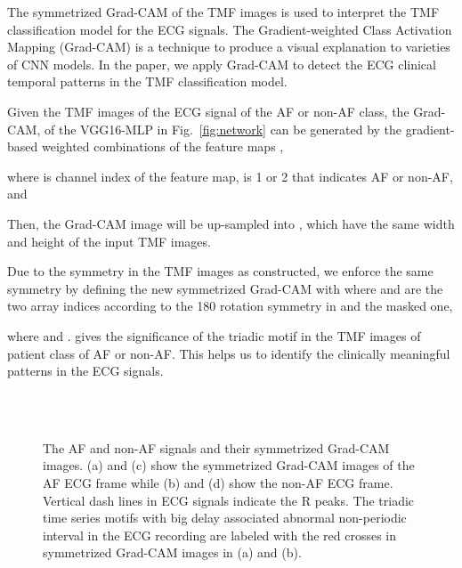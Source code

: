 \documentclass[journal]{IEEEtran}
\begin{document}
The symmetrized Grad-CAM of the TMF images is used to interpret the TMF classification model for the ECG signals. The Gradient-weighted Class Activation Mapping (Grad-CAM) \cite{Grad_CAM_2017} is a technique to produce a visual explanation to varieties of CNN models. In the paper, we apply Grad-CAM to detect the ECG clinical temporal patterns in the TMF classification model. 

Given the TMF images of the ECG signal of the AF or non-AF class, the Grad-CAM,  of the VGG16-MLP in Fig.~\ref{fig:network} can be generated by the gradient-based weighted combinations of the feature maps ,

where  is channel index of the feature map,  is 1 or 2 that indicates AF or non-AF, and

Then, the Grad-CAM image will be up-sampled into , which have the same width and height of the input TMF images. 

Due to the symmetry in the TMF images as constructed, we enforce the same symmetry by defining the new symmetrized Grad-CAM  with  where  and  are the two array indices according to the 180 rotation symmetry in  and the masked one,

where  and . 
 gives the significance of the triadic motif in the TMF images of patient class  of AF or non-AF. This helps us to identify the clinically meaningful patterns in the ECG signals.


\begin{figure*}[th]
  \centering
  \\  
  \\ 
  \caption{The AF and non-AF signals and their symmetrized Grad-CAM images. (a) and (c) show the symmetrized Grad-CAM images of the AF ECG frame while (b) and (d) show the non-AF ECG frame. Vertical dash lines in ECG signals indicate the R peaks. The triadic time series motifs with big delay associated abnormal non-periodic interval in the ECG recording are labeled with the red crosses in symmetrized Grad-CAM images in (a) and (b).} \label{fig:localization:AF}
\end{figure*}
\end{document}
